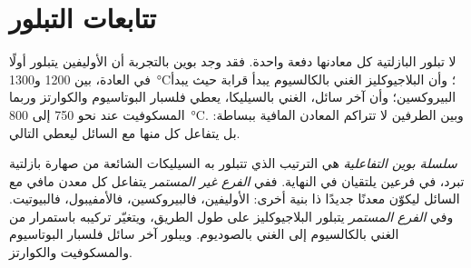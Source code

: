 \section{تتابعات التبلور}\label{sec:b2:magmatic-differentiation:sequences}

لا تبلور  البازلتية كل معادنها دفعة واحدة. فقد وجد بوين
بالتجربة أن الأوليفين يتبلور أولًا في العادة، بين 1200
و\qty{1300}{\celsius}؛ وأن البلاجيوكليز الغني بالكالسيوم يبدأ قرابة حيث يبدأ
البيروكسين؛ وأن آخر سائل، الغني بالسيليكا، يعطي فلسبار البوتاسيوم والكوارتز
وربما المسكوفيت عند نحو 750 إلى \qty{800}{\celsius}. وبين الطرفين لا تتراكم
المعادن المافية ببساطة: بل يتفاعل كل منها مع السائل ليعطي التالي.

\begin{definition}\label{def:b2:magmatic-differentiation:bowen}
\emph{سلسلة بوين التفاعلية} هي الترتيب الذي
تتبلور به السيليكات الشائعة من صهارة بازلتية تبرد، في فرعين
يلتقيان في النهاية. ففي \emph{الفرع غير المستمر} يتفاعل كل معدن مافي
مع السائل ليكوّن معدنًا جديدًا ذا بنية أخرى: الأوليفين،
فالبيروكسين، فالأمفيبول، فالبيوتيت. وفي \emph{الفرع المستمر} يتبلور البلاجيوكليز
على طول الطريق، ويتغيّر تركيبه باستمرار من الغني بالكالسيوم
إلى الغني بالصوديوم. ويبلور آخر سائل فلسبار البوتاسيوم والمسكوفيت
والكوارتز.
\end{definition}

